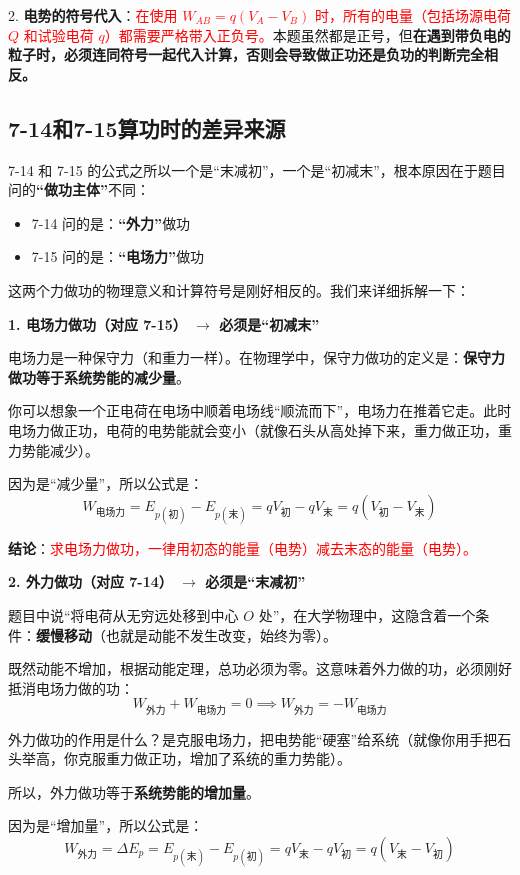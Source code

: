 2. \textbf{电势的符号代入}：\textcolor{red}{在使用 $W_{AB} = q(V_A - V_B)$ 时，所有的电量（包括场源电荷 $Q$ 和试验电荷 $q$）都需要严格带入正负号。}本题虽然都是正号，但\textbf{在遇到带负电的粒子时，必须连同符号一起代入计算，否则会导致做正功还是负功的判断完全相反。}

\subsection*{7-14和7-15算功时的差异来源}
7-14 和 7-15 的公式之所以一个是“末减初”，一个是“初减末”，根本原因在于题目问的\textbf{“做功主体”}不同：
\begin{itemize}
	\item 7-14 问的是：\textbf{“外力”}做功
	\item 7-15 问的是：\textbf{“电场力”}做功
\end{itemize}

这两个力做功的物理意义和计算符号是刚好相反的。我们来详细拆解一下：

\textbf{1. 电场力做功（对应 7-15） $\rightarrow$ 必须是“初减末”}

电场力是一种保守力（和重力一样）。在物理学中，保守力做功的定义是：\textbf{保守力做功等于系统势能的减少量}。

你可以想象一个正电荷在电场中顺着电场线“顺流而下”，电场力在推着它走。此时电场力做正功，电荷的电势能就会变小（就像石头从高处掉下来，重力做正功，重力势能减少）。

因为是“减少量”，所以公式是：
$$W_{\text{电场力}} = E_{p(\text{初})} - E_{p(\text{末})} = qV_{\text{初}} - qV_{\text{末}} = q(V_{\text{初}} - V_{\text{末}})$$

\textbf{结论}：\textcolor{red}{求电场力做功，一律用初态的能量（电势）减去末态的能量（电势）。}

\textbf{2. 外力做功（对应 7-14） $\rightarrow$ 必须是“末减初”}

题目中说“将电荷从无穷远处移到中心 $O$ 处”，在大学物理中，这隐含着一个条件：\textbf{缓慢移动}（也就是动能不发生改变，始终为零）。

既然动能不增加，根据动能定理，总功必须为零。这意味着外力做的功，必须刚好抵消电场力做的功：
$$W_{\text{外力}} + W_{\text{电场力}} = 0 \implies W_{\text{外力}} = - W_{\text{电场力}}$$

外力做功的作用是什么？是克服电场力，把电势能“硬塞”给系统（就像你用手把石头举高，你克服重力做正功，增加了系统的重力势能）。

所以，外力做功等于\textbf{系统势能的增加量}。

因为是“增加量”，所以公式是：
$$W_{\text{外力}} = \Delta E_p = E_{p(\text{末})} - E_{p(\text{初})} = qV_{\text{末}} - qV_{\text{初}} = q(V_{\text{末}} - V_{\text{初}})$$

